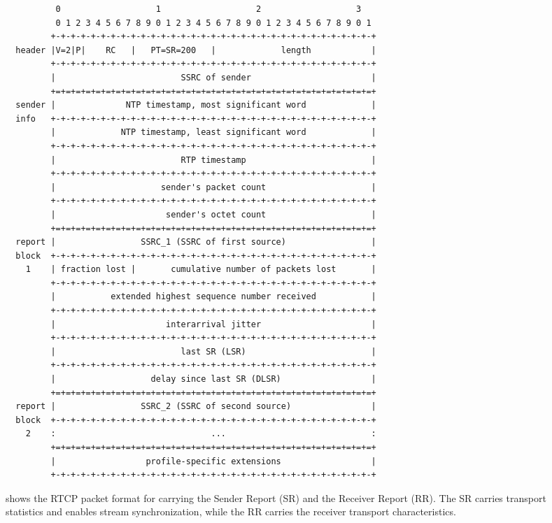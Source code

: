 \begin{figure}[!h]
\begin{spacing}{0.5}
{\footnotesize
\begin{verbatim}
          0                   1                   2                   3
          0 1 2 3 4 5 6 7 8 9 0 1 2 3 4 5 6 7 8 9 0 1 2 3 4 5 6 7 8 9 0 1
         +-+-+-+-+-+-+-+-+-+-+-+-+-+-+-+-+-+-+-+-+-+-+-+-+-+-+-+-+-+-+-+-+
  header |V=2|P|    RC   |   PT=SR=200   |             length            |
         +-+-+-+-+-+-+-+-+-+-+-+-+-+-+-+-+-+-+-+-+-+-+-+-+-+-+-+-+-+-+-+-+
         |                         SSRC of sender                        |
         +=+=+=+=+=+=+=+=+=+=+=+=+=+=+=+=+=+=+=+=+=+=+=+=+=+=+=+=+=+=+=+=+
  sender |              NTP timestamp, most significant word             |
  info   +-+-+-+-+-+-+-+-+-+-+-+-+-+-+-+-+-+-+-+-+-+-+-+-+-+-+-+-+-+-+-+-+
         |             NTP timestamp, least significant word             |
         +-+-+-+-+-+-+-+-+-+-+-+-+-+-+-+-+-+-+-+-+-+-+-+-+-+-+-+-+-+-+-+-+
         |                         RTP timestamp                         |
         +-+-+-+-+-+-+-+-+-+-+-+-+-+-+-+-+-+-+-+-+-+-+-+-+-+-+-+-+-+-+-+-+
         |                     sender's packet count                     |
         +-+-+-+-+-+-+-+-+-+-+-+-+-+-+-+-+-+-+-+-+-+-+-+-+-+-+-+-+-+-+-+-+
         |                      sender's octet count                     |
         +=+=+=+=+=+=+=+=+=+=+=+=+=+=+=+=+=+=+=+=+=+=+=+=+=+=+=+=+=+=+=+=+
  report |                 SSRC_1 (SSRC of first source)                 |
  block  +-+-+-+-+-+-+-+-+-+-+-+-+-+-+-+-+-+-+-+-+-+-+-+-+-+-+-+-+-+-+-+-+
    1    | fraction lost |       cumulative number of packets lost       |
         +-+-+-+-+-+-+-+-+-+-+-+-+-+-+-+-+-+-+-+-+-+-+-+-+-+-+-+-+-+-+-+-+
         |           extended highest sequence number received           |
         +-+-+-+-+-+-+-+-+-+-+-+-+-+-+-+-+-+-+-+-+-+-+-+-+-+-+-+-+-+-+-+-+
         |                      interarrival jitter                      |
         +-+-+-+-+-+-+-+-+-+-+-+-+-+-+-+-+-+-+-+-+-+-+-+-+-+-+-+-+-+-+-+-+
         |                         last SR (LSR)                         |
         +-+-+-+-+-+-+-+-+-+-+-+-+-+-+-+-+-+-+-+-+-+-+-+-+-+-+-+-+-+-+-+-+
         |                   delay since last SR (DLSR)                  |
         +=+=+=+=+=+=+=+=+=+=+=+=+=+=+=+=+=+=+=+=+=+=+=+=+=+=+=+=+=+=+=+=+
  report |                 SSRC_2 (SSRC of second source)                |
  block  +-+-+-+-+-+-+-+-+-+-+-+-+-+-+-+-+-+-+-+-+-+-+-+-+-+-+-+-+-+-+-+-+
    2    :                               ...                             :
         +=+=+=+=+=+=+=+=+=+=+=+=+=+=+=+=+=+=+=+=+=+=+=+=+=+=+=+=+=+=+=+=+
         |                  profile-specific extensions                  |
         +-+-+-+-+-+-+-+-+-+-+-+-+-+-+-+-+-+-+-+-+-+-+-+-+-+-+-+-+-+-+-+-+
\end{verbatim}
}
\end{spacing}
\caption{shows the RTCP packet format for carrying the Sender Report (SR) and
the Receiver Report (RR). The SR carries transport statistics and enables 
stream synchronization, while the RR carries the receiver transport 
characteristics.}
\label{fig:3:rtcp.hdr}
\end{figure}


